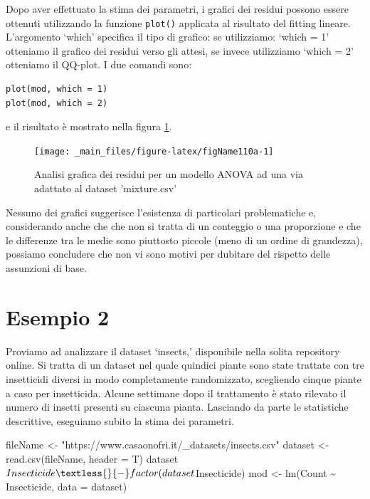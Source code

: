 \documentclass[a4paper,12pt,oneside]{book}
\newenvironment{Shaded}{\begin{snugshade}}{\end{snugshade}}
\newcommand{\SpecialCharTok}[1]{#1}
\newcommand{\StringTok}[1]{#1}
\newcommand{\OtherTok}[1]{#1}
\newcommand{\FunctionTok}[1]{#1}
\newcommand{\AttributeTok}[1]{#1}
\newcommand{\NormalTok}[1]{#1}
\begin{document}
Dopo aver effettuato la stima dei parametri, i grafici dei residui possono essere ottenuti utilizzando la funzione \texttt{plot()} applicata al risultato del fitting lineare. L'argomento `which' specifica il tipo di grafico: se utilizziamo: `which = 1' otteniamo il grafico dei residui verso gli attesi, se invece utilizziamo `which = 2' otteniamo il QQ-plot. I due comandi sono:

\begin{verbatim}
plot(mod, which = 1)
plot(mod, which = 2)
\end{verbatim}

e il risultato è mostrato nella figura \ref{fig:figName110a}.

\begin{figure}

{\centering \texttt{[image: \_main\_files/figure-latex/figName110a-1]} 

}

\caption{Analisi grafica dei residui per un modello ANOVA ad una via adattato al dataset 'mixture.csv'}\label{fig:figName110a}
\end{figure}

Nessuno dei grafici suggerisce l'esistenza di particolari problematiche e, considerando anche che che non si tratta di un conteggio o una proporzione e che le differenze tra le medie sono piuttosto piccole (meno di un ordine di grandezza), possiamo concludere che non vi sono motivi per dubitare del rispetto delle assunzioni di base.

\hypertarget{esempio-2}{%
\section{Esempio 2}\label{esempio-2}}

Proviamo ad analizzare il dataset `insects,' disponibile nella solita repository online. Si tratta di un dataset nel quale quindici piante sono state trattate con tre insetticidi diversi in modo completamente randomizzato, scegliendo cinque piante a caso per insetticida. Alcune settimane dopo il trattamento è stato rilevato il numero di insetti presenti su ciascuna pianta. Lasciando da parte le statistiche descrittive, eseguiamo subito la stima dei parametri.

\begin{Shaded}
\begin{Highlighting}[]
\NormalTok{fileName }\OtherTok{\textless{}{-}} \StringTok{"https://www.casaonofri.it/\_datasets/insects.csv"}
\NormalTok{dataset }\OtherTok{\textless{}{-}} \FunctionTok{read.csv}\NormalTok{(fileName, }\AttributeTok{header =}\NormalTok{ T)}
\NormalTok{dataset}\SpecialCharTok{$}\NormalTok{Insecticide }\OtherTok{\textless{}{-}} \FunctionTok{factor}\NormalTok{(dataset}\SpecialCharTok{$}\NormalTok{Insecticide)}
\NormalTok{mod }\OtherTok{\textless{}{-}} \FunctionTok{lm}\NormalTok{(Count }\SpecialCharTok{\textasciitilde{}}\NormalTok{ Insecticide, }\AttributeTok{data =}\NormalTok{ dataset)}
\end{Highlighting}
\end{Shaded}
\end{document}
